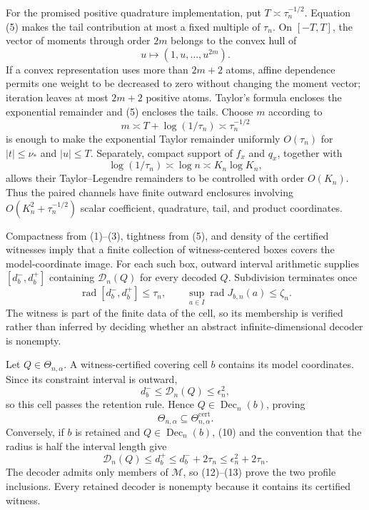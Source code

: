 For the promised positive quadrature implementation, put \(T\asymp\tau_n^{-1/2}\).  Equation (5) makes the tail contribution at most a fixed multiple of \(\tau_n\).  On \([-T,T]\), the vector of moments through order \(2m\) belongs to the convex hull of
\[
 u\longmapsto(1,u,\ldots,u^{2m}).
\]
If a convex representation uses more than \(2m+2\) atoms, affine dependence permits one weight to be decreased to zero without changing the moment vector; iteration leaves at most \(2m+2\) positive atoms.  Taylor's formula encloses the exponential remainder and (5) encloses the tails.  Choose \(m\) according to
\[
 m\asymp T+\log(1/\tau_n)\asymp\tau_n^{-1/2}                 \tag{8}
\]
is enough to make the exponential Taylor remainder uniformly \(O(\tau_n)\) for \(|t|\le\nu_*\) and \(|u|\le T\).  Separately, compact support of \(f_x\) and \(q_x\), together with
\[
 \log(1/\tau_n)\asymp\log n\asymp K_n\log K_n,              \tag{9}
\]
allows their Taylor--Legendre remainders to be controlled with order \(O(K_n)\).  Thus the paired channels have finite outward enclosures involving \(O(K_n^2+\tau_n^{-1/2})\) scalar coefficient, quadrature, tail, and product coordinates.

Compactness from (1)--(3), tightness from (5), and density of the certified witnesses imply that a finite collection of witness-centered boxes covers the model-coordinate image.  For each such box, outward interval arithmetic supplies \([d_b^-,d_b^+]\) containing \(\mathscr D_n(Q)\) for every decoded \(Q\).  Subdivision terminates once
\[
 \operatorname{rad}[d_b^-,d_b^+]\le\tau_n,
 \qquad
 \sup_{a\in I}\operatorname{rad}J_{b,n}(a)\le\zeta_n.       \tag{10}
\]
The witness is part of the finite data of the cell, so its membership is verified rather than inferred by deciding whether an abstract infinite-dimensional decoder is nonempty.

Let \(Q\in\Theta_{n,\alpha}\).  A witness-certified covering cell \(b\) contains its model coordinates.  Since its constraint interval is outward,
\[
 d_b^-\le\mathscr D_n(Q)\le\epsilon_n^2,                    \tag{11}
\]
so this cell passes the retention rule.  Hence \(Q\in\operatorname{Dec}_n(b)\), proving
\[
 \Theta_{n,\alpha}\subseteq\Theta^{\mathrm{cert}}_{n,\alpha}. \tag{12}
\]
Conversely, if \(b\) is retained and \(Q\in\operatorname{Dec}_n(b)\), (10) and the convention that the radius is half the interval length give
\[
 \mathscr D_n(Q)
 \le d_b^+
 \le d_b^-+2\tau_n
 \le\epsilon_n^2+2\tau_n.                                  \tag{13}
\]
The decoder admits only members of \(\mathcal M\), so (12)--(13) prove the two profile inclusions.  Every retained decoder is nonempty because it contains its certified witness.

